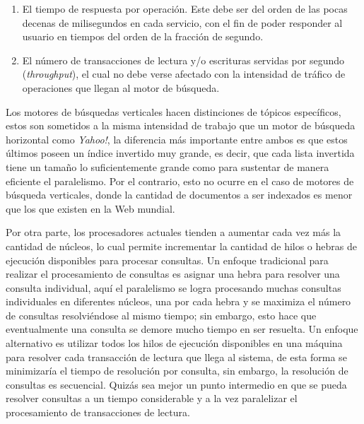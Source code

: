 \begin{enumerate}
  \item El tiempo de respuesta por operación. Este debe ser del orden de las pocas decenas de milisegundos en cada servicio, con el fin de poder responder al usuario en tiempos del orden de la fracción de segundo.
  \item El número de transacciones de lectura y/o escrituras servidas por segundo (\textit{throughput}), el cual no debe verse afectado con la intensidad de tráfico de operaciones que llegan al motor de búsqueda.
\end{enumerate}

Los motores de búsquedas verticales hacen distinciones de tópicos específicos, estos son sometidos a la misma intensidad de trabajo que un motor de búsqueda horizontal como \textit{Yahoo!}, la diferencia más importante entre ambos es que estos últimos poseen un índice invertido muy grande, es decir, que cada lista invertida tiene un tamaño lo suficientemente grande como para sustentar de manera eficiente el paralelismo. Por el contrario, esto no ocurre en el caso de motores de búsqueda verticales, donde la cantidad de documentos a ser indexados es menor que los que existen en la Web mundial.

Por otra parte, los procesadores actuales tienden a aumentar cada vez más la cantidad de núcleos, lo cual permite incrementar la cantidad de hilos o hebras de ejecución disponibles para procesar consultas. Un enfoque tradicional para realizar el procesamiento de consultas es asignar una hebra para resolver una consulta individual, aquí el paralelismo se logra procesando muchas consultas individuales en diferentes núcleos, una por cada hebra y se maximiza el número de consultas resolviéndose al mismo tiempo; sin embargo, esto hace que eventualmente una consulta se demore mucho tiempo en ser resuelta. Un enfoque alternativo es utilizar todos los hilos de ejecución disponibles en una máquina para resolver cada transacción de lectura que llega al sistema, de esta forma se minimizaría el tiempo de resolución por consulta, sin embargo, la resolución de consultas es secuencial. Quizás sea mejor un punto intermedio en que se pueda resolver consultas a un tiempo considerable y a la vez paralelizar el procesamiento de transacciones de lectura.

